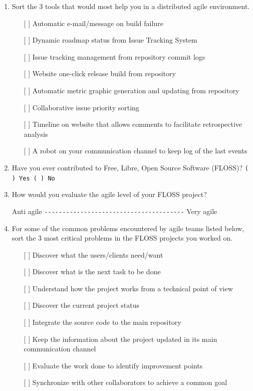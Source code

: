 \documentclass[lnbip]{svmultln}
\begin{document}
\begin{small}
\begin{enumerate}
  \item Sort the 3 tools that would most help you in a distributed
    agile environment.
    \begin{itemize}
    \item[[ ] ] Automatic e-mail/message on build failure
    \item[[ ] ] Dynamic roadmap status from Issue Tracking System
    \item[[ ] ] Issue tracking management from repository commit logs
    \item[[ ] ] Website one-click release build from repository
    \item[[ ] ] Automatic metric graphic generation and updating from
      repository
    \item[[ ] ] Collaborative issue priority sorting
    \item[[ ] ] Timeline on website that allows comments to
      facilitate retrospective analysis
    \item[[ ] ] A robot on your communication channel to keep log of
      the last events
    \end{itemize}
    \vspace{8pt}

  \item Have you ever contributed to Free, Libre, Open Source Software
    (FLOSS)?  \verb=( ) Yes ( ) No= \vspace{8pt}

  \item How would you evaluate the agile level of your FLOSS project?

    Anti agile \verb=---------------------------------------= Very
    agile \vspace{8pt}

  \item For some of the common problems encountered by agile teams
    listed below, sort the 3 most critical problems in the FLOSS
    projects you worked on.
    \begin{itemize}
    \item[[ ] ] Discover what the users/clients need/want
    \item[[ ] ] Discover what is the next task to be done
    \item[[ ] ] Understand how the project works from a technical
      point of view
    \item[[ ] ] Discover the current project status
    \item[[ ] ] Integrate the source code to the main repository
    \item[[ ] ] Keep the information about the project updated in its
      main communication channel
    \item[[ ] ] Evaluate the work done to identify improvement points
    \item[[ ] ] Synchronize with other collaborators to achieve a
      common goal
    \end{itemize}
    \vspace{8pt}


\end{enumerate}
\end{small}
\end{document}
